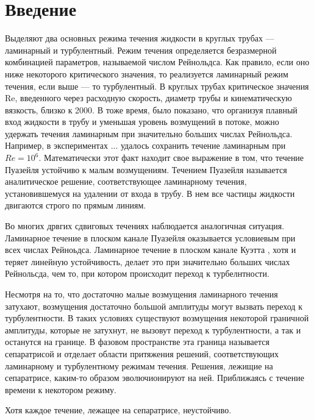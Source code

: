 \section{Введение}



Выделяют два основных режима течения жидкости в круглых трубах --- ламинарный и турбулентный. Режим течения определяется безразмерной комбинацией параметров, называемой числом Рейнольдса. Как правило, если оно ниже некоторого критического значения, то реализуется ламинарный режим течения, если выше --- то турбулентный. В круглых трубах критическое значения Re, введенного через расходную скорость, диаметр трубы и кинематическую вязкость, близко к 2000. В тоже время, было показано, что организуя плавный вход жидкости в трубу и уменьшая уровень возмущений в потоке, можно удержать течения ламинарным при значительно больших числах Рейнольдса. Например, в экспериментах ... удалось сохранить течение ламинарным при $Re = 10^6$. Математически этот факт находит свое выражение в том, что течение Пуазейля устойчиво к малым возмущениям. Течением Пуазейля называется аналитическое решение, соответствующее ламинарному течения, установившемуся на удалении от входа в трубу. В нем все частицы жидкости двигаются строго по прямым линиям. 


Во многих дрвгих сдвиговых течениях наблюдается аналогичная ситуация. Ламинарное течение в плоском канале Пуазейля оказывается условиевым при всех числах Рейноьдса. Ламинарное течение в плоском канале Куэтта , хотя и теряет линейную устойчивость, делает это при значительно больших числах Рейнольсда, чем то, при котором происходит переход к турбелнтности. 


Несмотря на то, что достаточно малые возмущения ламинарного течения затухают, возмущения достаточно большой амплитуды могут вызвать переход к турбулентности. В таких условиях существуют возмущения некоторой граничной амплитуды, которые не затухнут, не вызовут переход к турбулентности, а так и останутся на границе. В фазовом пространстве эта граница называется сепаратрисой и отделает области притяжения решений, соответствующих ламинарному и турбулентному режимам течения. Решения, лежищие на сепаратрисе, каким-то образом эволючионируют на ней. Приближаясь с течение времени к некотором режиму. 

Хотя каждое течение, лежащее на сепаратрисе, неустойчиво. 


